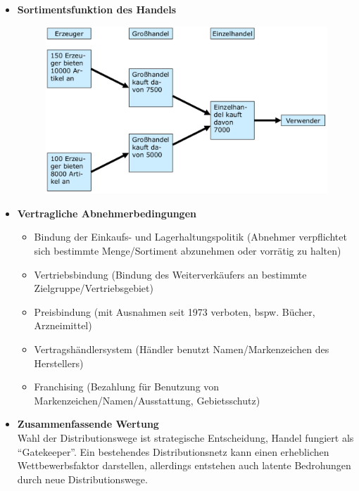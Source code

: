 \documentclass[a4paper,11pt, twoside]{article}
\begin{document}
\begin{itemize}
	\item \textbf{Sortimentsfunktion des Handels}
\begin{figure}[h]
 \begin{center}
   \includegraphics[scale=0.2]{bilder/sortimentsfunktion.png}
 \end{center}
\end{figure}

	\item \textbf{Vertragliche Abnehmerbedingungen}
\begin{itemize}
	\item Bindung der Einkaufs- und Lagerhaltungspolitik (Abnehmer verpflichtet sich bestimmte Menge/Sortiment abzunehmen oder vorrätig zu halten) 
	\item Vertriebsbindung (Bindung des Weiterverkäufers an bestimmte Zielgruppe/Vertriebsgebiet) 
	\item Preisbindung (mit Ausnahmen seit 1973 verboten, bspw. Bücher, Arzneimittel)
	\item Vertragshändlersystem (Händler benutzt Namen/Markenzeichen des Herstellers)
	\item Franchising (Bezahlung für Benutzung von Markenzeichen/Namen/Ausstattung, Gebietsschutz)
\end{itemize}

	\item \textbf{Zusammenfassende Wertung}\\
Wahl der Distributionswege ist strategische Entscheidung, Handel fungiert als "`Gatekeeper"'. Ein bestehendes Distributionsnetz kann einen erheblichen Wettbewerbsfaktor darstellen, allerdings entstehen auch latente Bedrohungen durch neue Distributionswege.
\end{itemize}
\end{document}
